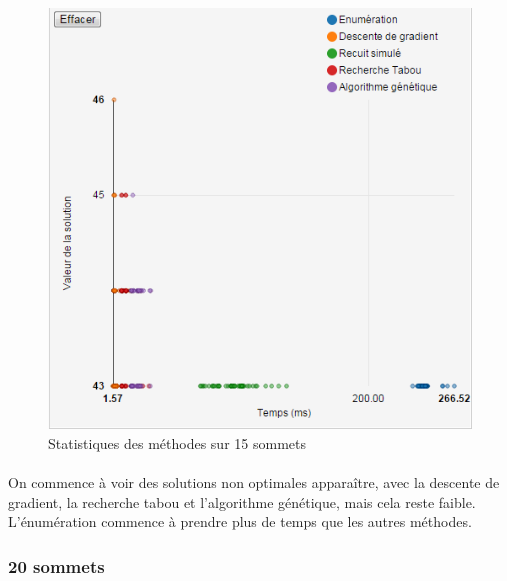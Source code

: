 \documentclass[12pt]{article}
\begin{document}
\begin{figure}[H]
	\begin{center}
	\includegraphics[scale=0.5]{pictures/results/15sommets.png}
	\end{center}
	\caption{Statistiques des méthodes sur 15 sommets \label{fig:15nodeResult}}
\end{figure}
\paragraph{} On commence à voir des solutions non optimales apparaître, avec la descente de gradient, la recherche tabou et l'algorithme génétique, mais cela reste faible. L'énumération commence à prendre plus de temps que les autres méthodes.

\subsubsection{20 sommets}
\end{document}
